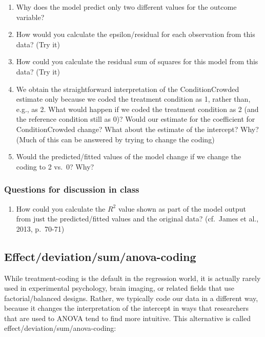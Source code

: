 \documentclass[
]{article}
\providecommand{\tightlist}{%
  \setlength{\itemsep}{0pt}\setlength{\parskip}{0pt}}
\begin{document}
\begin{enumerate}
\def\labelenumi{\arabic{enumi}.}
\tightlist
\item
  Why does the model predict only two different values for the outcome
  variable?
\item
  How would you calculate the epsilon/residual for each observation from
  this data? (Try it)
\item
  How could you calculate the residual sum of squares for this model
  from this data? (Try it)
\item
  We obtain the straightforward interpretation of the ConditionCrowded
  estimate only because we coded the treatment condition as 1, rather
  than, e.g., as 2. What would happen if we coded the treatment
  condition as 2 (and the reference condition still as 0)? Would our
  estimate for the coefficient for ConditionCrowded change? What about
  the estimate of the intercept? Why? (Much of this can be answered by
  trying to change the coding)
\item
  Would the predicted/fitted values of the model change if we change the
  coding to 2 vs.~0? Why?
\end{enumerate}

\hypertarget{questions-for-discussion-in-class}{%
\subsubsection{Questions for discussion in
class}\label{questions-for-discussion-in-class}}

\begin{enumerate}
\def\labelenumi{\arabic{enumi}.}
\setcounter{enumi}{5}
\tightlist
\item
  How could you calculate the \(R^2\) value shown as part of the model
  output from just the predicted/fitted values and the original data?
  (cf.~James et al., 2013, p.~70-71)
\end{enumerate}

\hypertarget{effectdeviationsumanova-coding}{%
\subsection{Effect/deviation/sum/anova-coding}\label{effectdeviationsumanova-coding}}

While treatment-coding is the default in the regression world, it is
actually rarely used in experimental psychology, brain imaging, or
related fields that use factorial/balanced designs. Rather, we typically
code our data in a different way, because it changes the interpretation
of the intercept in ways that researchers that are used to ANOVA tend to
find more intuitive. This alternative is called
effect/deviation/sum/anova-coding:
\end{document}
